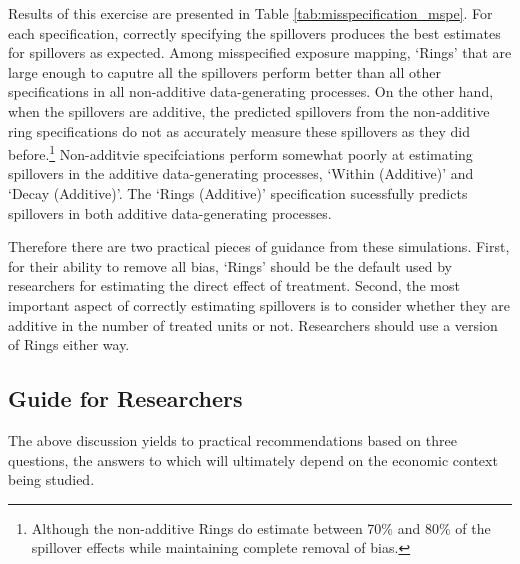 \documentclass[11pt]{article}
\begin{document}
Results of this exercise are presented in Table \ref{tab:misspecification_mspe}. For each specification, correctly specifying the spillovers produces the best estimates for spillovers as expected. Among misspecified exposure mapping, `Rings' that are large enough to caputre all the spillovers perform better than all other specifications in all non-additive data-generating processes. On the other hand, when the spillovers are additive, the predicted spillovers from the non-additive ring specifications do not as accurately measure these spillovers as they did before.\footnote{Although the non-additive Rings do estimate between 70\% and 80\% of the spillover effects while maintaining complete removal of bias.} Non-additvie specifciations perform somewhat poorly at estimating spillovers in the additive data-generating processes, `Within (Additive)' and `Decay (Additive)'. The `Rings (Additive)' specification sucessfully predicts spillovers in both additive data-generating processes. 

Therefore there are two practical pieces of guidance from these simulations. First, for their ability to remove all bias, `Rings' should be the default used by researchers for estimating the direct effect of treatment. Second, the most important aspect of correctly estimating spillovers is to consider whether they are additive in the number of treated units or not. Researchers should use a version of Rings either way.


\subsection{Guide for Researchers}
\label{sec:parameterize}

The above discussion yields to practical recommendations based on three questions, the answers to which will ultimately depend on the economic context being studied. 
\end{document}
